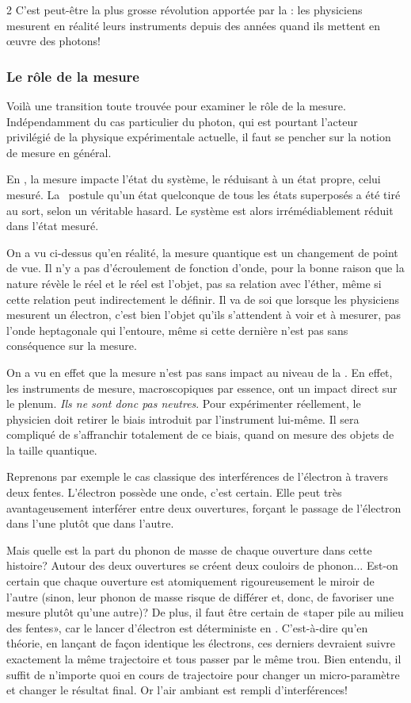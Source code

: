 \begin{multicols}{2}
C'est peut-être la plus grosse révolution apportée par la \PQ: les
physiciens mesurent en réalité leurs instruments depuis des années
quand ils mettent en œuvre des photons!

\subsubsection{Le rôle de la mesure}

Voilà une transition toute trouvée pour examiner le rôle de la
mesure. Indépendamment du cas particulier du photon, qui est pourtant
l'acteur privilégié de la physique expérimentale actuelle, il faut se pencher
sur la notion de mesure en général.

En \MQ, la mesure impacte l'état du système, le réduisant à un état
propre, celui mesuré. La \MQ\ postule qu'un état quelconque de tous les
états superposés a été tiré au sort, selon un véritable hasard. Le
système est alors irrémédiablement réduit dans l'état mesuré.

On a vu ci-dessus qu'en réalité, la mesure quantique est un changement
de point de vue. Il n'y a pas d'écroulement de fonction d'onde, pour
la bonne raison que la nature révèle le réel et le réel est l'objet,
pas sa relation avec l'éther, même si cette relation peut
indirectement le définir. Il va de soi que lorsque les physiciens mesurent un
électron, c'est bien l'objet  qu'ils s'attendent à voir et à
mesurer, pas l'onde heptagonale qui l'entoure, même si cette dernière
n'est pas sans conséquence sur la mesure.

On a vu en effet que la mesure n'est pas sans impact au
niveau de la \PQ. En effet, les instruments de mesure, macroscopiques
par essence, ont un impact direct sur le plenum. \textit{Ils ne sont donc pas
neutres}. Pour expérimenter réellement, le physicien doit retirer le biais introduit par l'instrument lui-même.
Il sera compliqué de s'affranchir totalement de ce biais, quand on
mesure des objets de la taille quantique.

Reprenons par exemple le cas classique des interférences de l'électron
à travers deux fentes. L'électron possède une onde, c'est certain.
Elle peut très avantageusement interférer entre deux ouvertures,
forçant le passage de l'électron dans l'une plutôt que dans l'autre.

Mais quelle est la part du phonon de masse de chaque ouverture dans cette
histoire? Autour des deux ouvertures se créent deux couloirs de
phonon$\ldots$ Est-on certain que chaque ouverture est atomiquement
rigoureusement le miroir de l'autre (sinon, leur phonon de masse
risque de différer et, donc, de favoriser une mesure plutôt qu'une
autre)? De plus, il faut être certain de «taper pile au milieu des
fentes», car le lancer d'électron est déterministe en \PQ.
C'est-à-dire qu'en théorie, en lançant de façon identique les
électrons, ces derniers devraient suivre exactement la même trajectoire et
tous passer par le même trou. Bien entendu, il suffit de n'importe
quoi en cours de trajectoire pour changer un micro-paramètre et
changer le résultat final. Or l'air ambiant est rempli
d'interférences!


\end{multicols}
